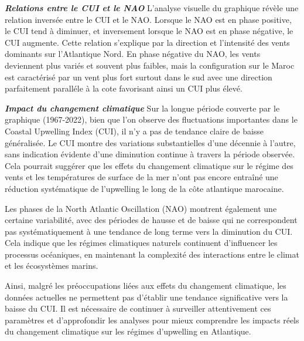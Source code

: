 \textbf{\textit{Relations entre le CUI et le NAO}}
L’analyse visuelle du graphique révèle une relation inversée entre le CUI et le NAO. Lorsque le NAO est en phase positive, le CUI tend à diminuer, et inversement lorsque le NAO est en phase négative, le CUI augmente. Cette relation s’explique par la direction et l’intensité des vents dominants sur l’Atlantique Nord. En phase négative du NAO, les vents deviennent plus variés et souvent plus faibles, mais la configuration sur le Maroc est caractérisé par un vent plus fort surtout dans le sud avec une direction parfaitement paralléle à la cote favorisant ainsi un CUI plus élevé. 

\textbf{\textit{Impact du changement climatique}}
Sur la longue période couverte par le graphique (1967-2022), bien que l'on observe des fluctuations importantes dans le Coastal Upwelling Index (CUI), il n'y a pas de tendance claire de baisse généralisée. Le CUI montre des variations substantielles d’une décennie à l’autre, sans indication évidente d’une diminution continue à travers la période observée. Cela pourrait suggérer que les effets du changement climatique sur le régime des vents et les températures de surface de la mer n'ont pas encore entraîné une réduction systématique de l’upwelling le long de la côte atlantique marocaine.

Les phases de la North Atlantic Oscillation (NAO) montrent également une certaine variabilité, avec des périodes de hausse et de baisse qui ne correspondent pas systématiquement à une tendance de long terme vers la diminution du CUI. Cela indique que les régimes climatiques naturels continuent d'influencer les processus océaniques, en maintenant la complexité des interactions entre le climat et les écosystèmes marins.

Ainsi, malgré les préoccupations liées aux effets du changement climatique, les données actuelles ne permettent pas d’établir une tendance significative vers la baisse du CUI. Il est nécessaire de continuer à surveiller attentivement ces paramètres et d’approfondir les analyses pour mieux comprendre les impacts réels du changement climatique sur les régimes d’upwelling en Atlantique.
